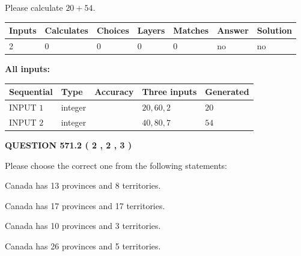 \documentclass[12pt]{article}
\begin{document}
  
 
Please calculate $ %
20 +  %
54 $.
 
 
   
   
   
   
\noindent\begin{tabular}{|l|l|l|l|l|l|l|}
 \hline
Inputs & Calculates & Choices & Layers & Matches & Answer & Solution \\ \hline
 2  & 
 0  & 
 0
  & 
 0  & 
 0  & 
  no & 
  no 
  \\ \hline
 \end{tabular}
   
   
   
   
\noindent{}
   
   
   
   
\noindent\vspace{0.1in}\hspace{-0.08in} {\textbf{\Large{All inputs: }}}
   
   
  
  
\noindent\begin{tabular}{|l|l|l|l|l|}
\hline
 Sequential & Type & Accuracy & Three inputs & Generated \\ 
\hline
 
 
  INPUT $  1 $ & integer &  & $
 20
 , 
 60
 , 
 2
 $ & $ 20 $ 
 \\  \hline  
 
 
  INPUT $  2 $ & integer &  & $
 40
 , 
 80
 , 
 7
 $ & $ 54 $ 
 \\  \hline  
 \end{tabular}
   
   
  
\vspace{0.2in}
  
{\textbf{\Large{QUESTION
571.2 
 ( 2 , 2 , 3 )
}}}
  
  
Please choose the correct one from the following statements:
 
 
Canada has  13 provinces and  8 territories.
 
 
Canada has  17 provinces and  17 territories.
 
 
Canada has 10  provinces and 3 territories.
 
 
Canada has  26 provinces and  5 territories.
 
\end{document}
